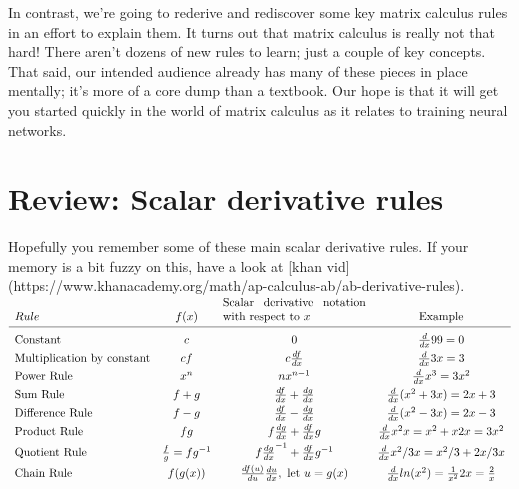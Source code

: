 \documentclass[11pt]{article}
\begin{document}
In contrast, we're going to rederive and rediscover some key matrix calculus rules in an effort to explain them. It turns out that matrix calculus is really not that hard! There aren't dozens of new rules to learn; just a couple of key concepts.  That said, our intended audience already has many of these pieces in place mentally; it's more of a core dump than a textbook. Our hope is that it will get you started quickly in the world of matrix calculus as it relates to training neural networks.

\section{Review: Scalar derivative rules}

Hopefully you remember some of these main scalar derivative rules. If your memory is a bit fuzzy on this, have a look at [khan vid](https://www.khanacademy.org/math/ap-calculus-ab/ab-derivative-rules).

$
\begin{array}{lccc}
Rule & f(x) & \text{\parbox[t][0mm][b]{43mm}{Scalar derivative notation with respect to $x$}} & \text{Example}\\
\\[\dimexpr-\normalbaselineskip+2pt]
\hline
\\[\dimexpr-\normalbaselineskip+5pt]
\vspace{1mm}
\text{Constant} & c & 0 &  \frac{d}{dx}99 = 0\\
\vspace{1mm}
\text{Multiplication by constant} &	cf	&c \frac{df}{dx} & \frac{d}{dx}3x = 3\\
\vspace{1mm}
\text{Power Rule}	& x^n	& nx^{n-1} & \frac{d}{dx}x^3 = 3x^2\\
\vspace{1mm}
\text{Sum Rule}	& f + g	& \frac{df}{dx} + \frac{dg}{dx} & \frac{d}{dx} (x^2 + 3x) = 2x + 3\\
\vspace{1mm}
\text{Difference Rule}	& f - g	& \frac{df}{dx} - \frac{dg}{dx} & \frac{d}{dx}(x^2 - 3x) = 2x - 3\\
\vspace{1mm}
\text{Product Rule}	& fg & f \frac{dg}{dx} + \frac{df}{dx} g & \frac{d}{dx}x^2x = x^2 + x2x = 3x^2\\
\vspace{1mm}
\text{Quotient Rule}	& \frac{f}{g} = fg^{-1} & f \frac{dg}{dx}^{-1} + \frac{df}{dx} g^{-1} & \frac{d}{dx}x^2 / 3x = x^2/3 + 2x / 3x\\
\text{Chain Rule}	 & f(g(x)) &   \frac{df(u)}{du}\frac{du}{dx}, \text{ let } u=g(x) & \frac{d}{dx} ln(x^2) = \frac{1}{x^2}2x = \frac{2}{x}\\
\end{array}
$
\end{document}
